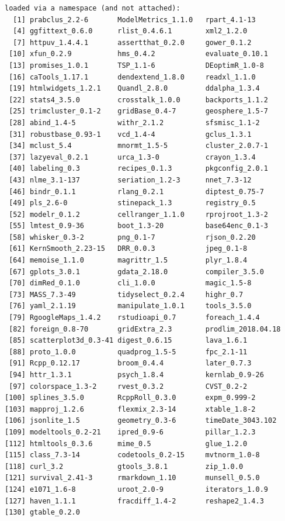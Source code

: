 \documentclass[11pt,oneside,a4paper]{reedthesis}
\begin{document}
\begin{verbatim}
loaded via a namespace (and not attached):
  [1] prabclus_2.2-6       ModelMetrics_1.1.0   rpart_4.1-13        
  [4] ggfittext_0.6.0      rlist_0.4.6.1        xml2_1.2.0          
  [7] httpuv_1.4.4.1       assertthat_0.2.0     gower_0.1.2         
 [10] xfun_0.2.9           hms_0.4.2            evaluate_0.10.1     
 [13] promises_1.0.1       TSP_1.1-6            DEoptimR_1.0-8      
 [16] caTools_1.17.1       dendextend_1.8.0     readxl_1.1.0        
 [19] htmlwidgets_1.2.1    Quandl_2.8.0         ddalpha_1.3.4       
 [22] stats4_3.5.0         crosstalk_1.0.0      backports_1.1.2     
 [25] trimcluster_0.1-2    gridBase_0.4-7       geosphere_1.5-7     
 [28] abind_1.4-5          withr_2.1.2          sfsmisc_1.1-2       
 [31] robustbase_0.93-1    vcd_1.4-4            gclus_1.3.1         
 [34] mclust_5.4           mnormt_1.5-5         cluster_2.0.7-1     
 [37] lazyeval_0.2.1       urca_1.3-0           crayon_1.3.4        
 [40] labeling_0.3         recipes_0.1.3        pkgconfig_2.0.1     
 [43] nlme_3.1-137         seriation_1.2-3      nnet_7.3-12         
 [46] bindr_0.1.1          rlang_0.2.1          diptest_0.75-7      
 [49] pls_2.6-0            stinepack_1.3        registry_0.5        
 [52] modelr_0.1.2         cellranger_1.1.0     rprojroot_1.3-2     
 [55] lmtest_0.9-36        boot_1.3-20          base64enc_0.1-3     
 [58] whisker_0.3-2        png_0.1-7            rjson_0.2.20        
 [61] KernSmooth_2.23-15   DRR_0.0.3            jpeg_0.1-8          
 [64] memoise_1.1.0        magrittr_1.5         plyr_1.8.4          
 [67] gplots_3.0.1         gdata_2.18.0         compiler_3.5.0      
 [70] dimRed_0.1.0         cli_1.0.0            magic_1.5-8         
 [73] MASS_7.3-49          tidyselect_0.2.4     highr_0.7           
 [76] yaml_2.1.19          manipulate_1.0.1     tools_3.5.0         
 [79] RgoogleMaps_1.4.2    rstudioapi_0.7       foreach_1.4.4       
 [82] foreign_0.8-70       gridExtra_2.3        prodlim_2018.04.18  
 [85] scatterplot3d_0.3-41 digest_0.6.15        lava_1.6.1          
 [88] proto_1.0.0          quadprog_1.5-5       fpc_2.1-11          
 [91] Rcpp_0.12.17         broom_0.4.4          later_0.7.3         
 [94] httr_1.3.1           psych_1.8.4          kernlab_0.9-26      
 [97] colorspace_1.3-2     rvest_0.3.2          CVST_0.2-2          
[100] splines_3.5.0        RcppRoll_0.3.0       expm_0.999-2        
[103] mapproj_1.2.6        flexmix_2.3-14       xtable_1.8-2        
[106] jsonlite_1.5         geometry_0.3-6       timeDate_3043.102   
[109] modeltools_0.2-21    ipred_0.9-6          pillar_1.2.3        
[112] htmltools_0.3.6      mime_0.5             glue_1.2.0          
[115] class_7.3-14         codetools_0.2-15     mvtnorm_1.0-8       
[118] curl_3.2             gtools_3.8.1         zip_1.0.0           
[121] survival_2.41-3      rmarkdown_1.10       munsell_0.5.0       
[124] e1071_1.6-8          uroot_2.0-9          iterators_1.0.9     
[127] haven_1.1.1          fracdiff_1.4-2       reshape2_1.4.3      
[130] gtable_0.2.0        
\end{verbatim}
\backmatter
\end{document}
